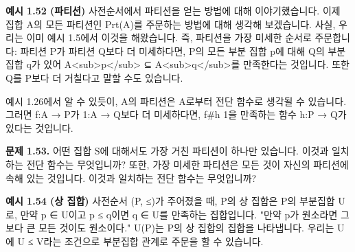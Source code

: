 \documentclass[11pt, a4paper, twoside, openany]{book}
\begin{document}
\par\medskip
\textbf{예시 1.52 (파티션)}
사전순서에서 파티션을 얻는 방법에 대해 이야기했습니다. 이제 집합 A\hspace{0pt}의 모든 파티션인 Prt(A)를 주문하는 방법에 대해 생각해 보겠습니다. 사실, 우리는 이미 예시 1.5\hspace{0pt}에서 이것을 해왔습니다. 즉, 파티션을 가장 미세한 순서로 주문합니다: 파티션 P\hspace{0pt}가 파티션 Q\hspace{0pt}보다 더 미세하다면, P\hspace{0pt}의 모든 부분 집합 p\hspace{0pt}에 대해 Q\hspace{0pt}의 부분 집합 q\hspace{0pt}가 있어 A<sub>p</sub> ⊆ A<sub>q</sub>를 만족한다는 것입니다. 또한 Q\hspace{0pt}를 P\hspace{0pt}보다 더 거칠다고 말할 수도 있습니다.

\par\medskip
예시 1.26\hspace{0pt}에서 알 수 있듯이, A\hspace{0pt}의 파티션은 A\hspace{0pt}로부터 전단 함수로 생각될 수 있습니다. 그러면 f:A → P\hspace{0pt}가 1:A → Q\hspace{0pt}보다 더 미세하다면, f\#h  1\hspace{0pt}을 만족하는 함수 h:P → Q\hspace{0pt}가 있다는 것입니다.

\par\medskip
\textbf{문제 1.53.}
어떤 집합 S\hspace{0pt}에 대해서도 가장 거친 파티션이 하나만 있습니다. 이것과 일치하는 전단 함수는 무엇입니까? 또한, 가장 미세한 파티션은 모든 것이 자신의 파티션에 속해 있는 것입니다. 이것과 일치하는 전단 함수는 무엇입니까?

\par\medskip
\textbf{예시 1.54 (상 집합)}
사전순서 (P, ≤)가 주어졌을 때, P\hspace{0pt}의 상 집합은 P\hspace{0pt}의 부분집합 U\hspace{0pt}로, 만약 p ∈ U\hspace{0pt}이고 p ≤ q\hspace{0pt}이면 q ∈ U\hspace{0pt}를 만족하는 집합입니다. "만약 p\hspace{0pt}가 원소라면 그보다 큰 모든 것이도 원소이다." U(P)는 P\hspace{0pt}의 상 집합의 집합을 나타냅니다. 우리는 U\hspace{0pt}에 U ≤ V\hspace{0pt}라는 조건으로 부분집합 관계로 주문을 할 수 있습니다.
\end{document}
